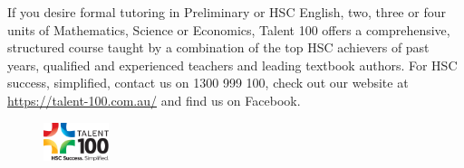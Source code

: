 \documentclass[a4paper,11pt]{article}
\begin{document}
If you desire formal tutoring in Preliminary or HSC English, two, three or four units of Mathematics, Science or Economics, Talent 100 offers a comprehensive, structured course taught by a combination of the top HSC achievers of past years, qualified and experienced teachers and leading textbook authors. For HSC success, simplified, contact us on 1300 999 100, check out our website at \url{https://talent-100.com.au/} and find us on Facebook. 

\vfill

\begin{figure}[H]
\centering
\includegraphics[width=0.17\textwidth]{t100.png}
\end{figure}
\end{document}
